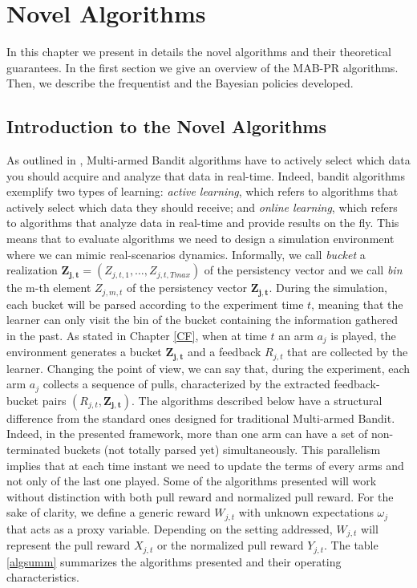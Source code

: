 \chapter{Novel Algorithms}\label{C10}
In this chapter we present in details the novel algorithms and their theoretical guarantees. In the first section we give an overview of the MAB-PR algorithms. Then, we describe the frequentist and the Bayesian policies developed.


\section{Introduction to the Novel Algorithms}

As outlined in \cite{banditalgowebopt}, Multi-armed Bandit algorithms have to actively select which data you should acquire and analyze that data in real-time. Indeed, bandit algorithms exemplify two types of learning: \emph{active learning}, which refers to algorithms that actively select which data they should receive; and \emph{online learning}, which refers to algorithms that analyze data in real-time and provide results on the fly. This means that to evaluate algorithms we need to design a simulation environment where we can mimic real-scenarios dynamics. Informally, we call \emph{bucket} a realization $\boldsymbol{Z_{j,t}}= (Z_{j,t,1},\dots, Z_{j,t,Tmax})$ of the persistency vector and we call \emph{bin}  the m-th element  $Z_{j,m,t}$  of the persistency vector $\boldsymbol{Z_{j,t}}$.   During the simulation, each bucket will be parsed according to the experiment time $t$, meaning that the learner can only visit the bin of the bucket containing the information gathered in the past. As stated in Chapter \ref{CF}, when at time $t$ an arm $a_j$ is played, the environment generates a bucket $\boldsymbol{Z_{j,t}}$ and a feedback $R_{j,t}$ that are collected by the learner.
Changing the point of view, we can say that, during the experiment, each arm $a_j$ collects a sequence of pulls, characterized by the extracted feedback-bucket pairs $(R_ {j, t}, \boldsymbol{Z_ {j, t}})$. The algorithms described below have a structural difference from the standard ones designed for traditional Multi-armed Bandit. Indeed, in the presented framework, more than one arm can have a set of non-terminated buckets (not totally parsed yet) simultaneously.  This parallelism implies that at each time instant we need to update the terms of every arms and not only of the last one played. Some of the algorithms presented will work without distinction with both pull reward and normalized pull reward.  For the sake of clarity, we define a generic reward $W_{j,t}$ with unknown expectations $\omega_j$ that acts as a proxy variable. Depending on the setting addressed, $W_{j,t}$ will represent the pull reward $X_{j,t}$ or the normalized pull reward $Y_{j,t}$. The table \ref{algsumm} summarizes the algorithms presented and their operating characteristics.

